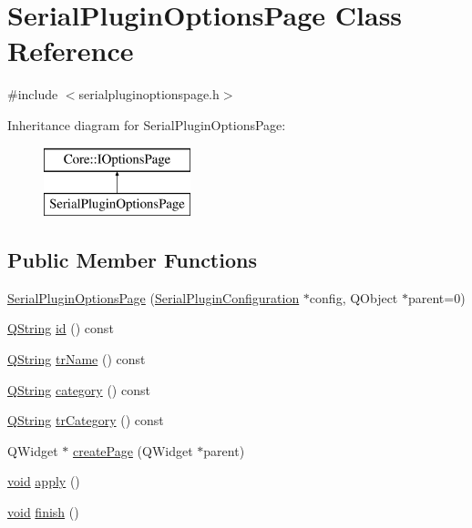 \hypertarget{class_serial_plugin_options_page}{\section{\-Serial\-Plugin\-Options\-Page \-Class \-Reference}
\label{class_serial_plugin_options_page}
}


{\ttfamily \#include $<$serialpluginoptionspage.\-h$>$}

\-Inheritance diagram for \-Serial\-Plugin\-Options\-Page\-:\begin{figure}[H]
\begin{center}
\leavevmode
\includegraphics[height=2.000000cm]{class_serial_plugin_options_page}
\end{center}
\end{figure}
\subsection*{\-Public \-Member \-Functions}
\begin{DoxyCompactItemize}
\item 
\hyperlink{group___serial_plugin_gabbba5e225f4b24b0ff2762edd89a7c85}{\-Serial\-Plugin\-Options\-Page} (\hyperlink{class_serial_plugin_configuration}{\-Serial\-Plugin\-Configuration} $\ast$config, \-Q\-Object $\ast$parent=0)
\item 
\hyperlink{group___u_a_v_objects_plugin_gab9d252f49c333c94a72f97ce3105a32d}{\-Q\-String} \hyperlink{group___serial_plugin_gaadfb80c5939566ed536ef5e6d49601fd}{id} () const 
\item 
\hyperlink{group___u_a_v_objects_plugin_gab9d252f49c333c94a72f97ce3105a32d}{\-Q\-String} \hyperlink{group___serial_plugin_ga6558090ef30ec926b500dc27787f194a}{tr\-Name} () const 
\item 
\hyperlink{group___u_a_v_objects_plugin_gab9d252f49c333c94a72f97ce3105a32d}{\-Q\-String} \hyperlink{group___serial_plugin_ga11d58b7fe11ee48ac5a865eaea4d9a13}{category} () const 
\item 
\hyperlink{group___u_a_v_objects_plugin_gab9d252f49c333c94a72f97ce3105a32d}{\-Q\-String} \hyperlink{group___serial_plugin_ga65036a91c24758081e8a2cecc44925a0}{tr\-Category} () const 
\item 
\-Q\-Widget $\ast$ \hyperlink{group___serial_plugin_ga77331da48998f8e92c60751f5e2ab862}{create\-Page} (\-Q\-Widget $\ast$parent)
\item 
\hyperlink{group___u_a_v_objects_plugin_ga444cf2ff3f0ecbe028adce838d373f5c}{void} \hyperlink{group___serial_plugin_ga442981f9537c634cbc6bd160f30c0a8a}{apply} ()
\item 
\hyperlink{group___u_a_v_objects_plugin_ga444cf2ff3f0ecbe028adce838d373f5c}{void} \hyperlink{group___serial_plugin_ga7d5463f2125597e0962512fde1cd83e4}{finish} ()
\end{DoxyCompactItemize}



